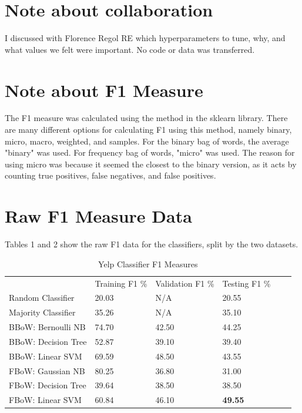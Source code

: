 \documentclass[11pt]{article}
\begin{document}
\pagebreak
\section{Note about collaboration}
I discussed with Florence Regol RE which hyperparameters to tune, why, and what values we felt were important. No code or data was transferred.

\section{Note about F1 Measure}
The F1 measure was calculated using the method in the sklearn library. There are many different options for calculating F1 using this method, namely binary, micro, macro, weighted, and samples. For the binary bag of words, the average "binary" was used. For frequency bag of words, "micro" was used. The reason for using micro was because it seemed the closest to the binary version, as it acts by counting true positives, false negatives, and false positives.

\section{Raw F1 Measure Data}
Tables 1 and 2 show the raw F1 data for the classifiers, split by the two datasets.
\begin{table}[ht]
\centering
\caption{Yelp Classifier F1 Measures}
\label{my-label}
\begin{tabular}{llllll}
                                                 & Training F1 \%             & Validation F1 \%           & Testing F1 \% &  &  \\ \cline{1-4}
\multicolumn{1}{l|}{Random Classifier}           & \multicolumn{1}{l|}{20.03} & \multicolumn{1}{l|}{N/A}   & 20.55         &  &  \\
\multicolumn{1}{l|}{Majority Classifier}         & \multicolumn{1}{l|}{35.26} & \multicolumn{1}{l|}{N/A}   & 35.10         &  &  \\
\multicolumn{1}{l|}{BBoW: Bernoulli NB} & \multicolumn{1}{l|}{74.70} & \multicolumn{1}{l|}{42.50} & 44.25         &  &  \\
\multicolumn{1}{l|}{BBoW: Decision Tree}         & \multicolumn{1}{l|}{52.87} & \multicolumn{1}{l|}{39.10} & 39.40         &  &  \\
\multicolumn{1}{l|}{BBoW: Linear SVM}            & \multicolumn{1}{l|}{69.59} & \multicolumn{1}{l|}{48.50} & 43.55         &  &  \\
\multicolumn{1}{l|}{FBoW: Gaussian NB}  & \multicolumn{1}{l|}{80.25} & \multicolumn{1}{l|}{36.80} & 31.00         &  &  \\
\multicolumn{1}{l|}{FBoW: Decision Tree}         & \multicolumn{1}{l|}{39.64} & \multicolumn{1}{l|}{38.50} & 38.50         &  &  \\
\multicolumn{1}{l|}{FBoW: Linear SVM}            & \multicolumn{1}{l|}{60.84} & \multicolumn{1}{l|}{46.10} & \textbf{49.55}         &  & 
\end{tabular}
\end{table}
\end{document}
